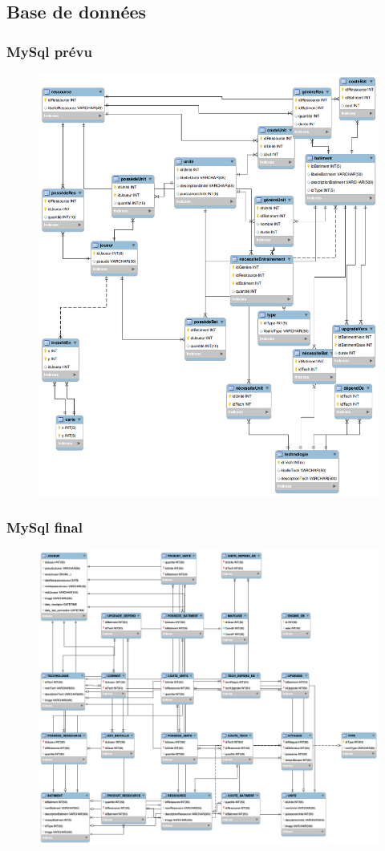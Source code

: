 \documentclass[11pt,a4paper]{article}
\begin{document}
\subsection{Base de données}
\subsubsection{MySql prévu}
\begin{figure}[!h]
\includegraphics[scale=0.3]{./sql/last.png}
\end{figure}
\newpage\subsubsection{MySql final}
\begin{figure}[!h]
\includegraphics[scale=0.3]{./sql/final.png}
\end{figure}
\end{document}
